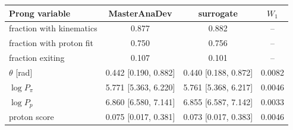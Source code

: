 \begin{tabular}{lccc}
\toprule
Prong variable & MasterAnaDev & surrogate & $W_1$ \\
\midrule
fraction with kinematics & 0.877 & 0.882 & -- \\
fraction with proton fit & 0.750 & 0.756 & -- \\
fraction exiting & 0.107 & 0.101 & -- \\
$\theta$ [rad] & 0.442 [0.190, 0.882] & 0.440 [0.188, 0.872] & 0.0082 \\
$\log P_\pi$ & 5.771 [5.363, 6.220] & 5.761 [5.368, 6.217] & 0.0046 \\
$\log P_p$ & 6.860 [6.580, 7.141] & 6.855 [6.587, 7.142] & 0.0033 \\
proton score & 0.075 [0.017, 0.381] & 0.073 [0.017, 0.383] & 0.0046 \\
\bottomrule
\end{tabular}
